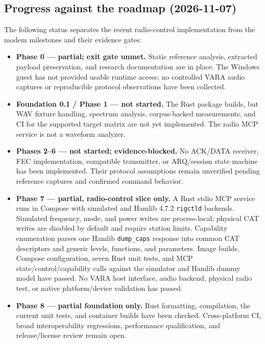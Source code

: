\documentclass[11pt,a4paper]{article}
\begin{document}
\subsection{Progress against the roadmap (2026-11-07)}
The following status separates the recent radio-control implementation from
the modem milestones and their evidence gates:
\begin{itemize}[leftmargin=*]
  \item \textbf{Phase 0 --- partial; exit gate unmet.} Static reference
        analysis, extracted payload preservation, and research documentation
        are in place. The Windows guest has not provided usable runtime access;
        no controlled VARA audio captures or reproducible protocol observations
        have been collected.
  \item \textbf{Foundation 0.1 / Phase 1 --- not started.} The Rust package
        builds, but WAV fixture handling, spectrum analysis, corpus-backed
        measurements, and CI for the supported target matrix are not yet
        implemented. The radio MCP service is not a waveform analyzer.
  \item \textbf{Phases 2--6 --- not started; evidence-blocked.} No ACK/DATA
        receiver, FEC implementation, compatible transmitter, or ARQ/session
        state machine has been implemented. Their protocol assumptions remain
        unverified pending reference captures and confirmed command behavior.
  \item \textbf{Phase 7 --- partial, radio-control slice only.} A Rust stdio
        MCP service runs in Compose with simulated and Hamlib 4.7.2
        \texttt{rigctld} backends. Simulated frequency, mode, and power writes
        are process-local; physical CAT writes are disabled by default and
        require station limits. Capability enumeration parses one Hamlib
        \texttt{dump\_caps} response into common CAT descriptors and generic
        levels, functions, and parameters. Image builds, Compose configuration,
        seven Rust unit tests, and MCP state/control/capability calls against
        the simulator and Hamlib dummy model have passed. No VARA host
        interface, audio backend, physical radio test, or native
        platform/device validation has passed.
  \item \textbf{Phase 8 --- partial foundation only.} Rust formatting,
        compilation, the current unit tests, and container builds have been
        checked. Cross-platform CI, broad interoperability regressions,
        performance qualification, and release/license review remain open.
\end{itemize}
\end{document}
